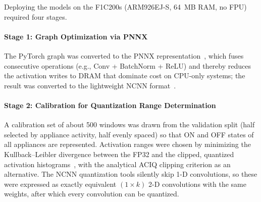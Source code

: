 \documentclass[fleqn,10pt]{wlscirep}
\begin{document}
Deploying the models on the F1C200s (ARM926EJ-S, 64~MB RAM, no FPU) required four stages.

\paragraph{Stage 1: Graph Optimization via PNNX}
The PyTorch graph was converted to the PNNX representation~\cite{pnnx}, which fuses consecutive operations (e.g., Conv + BatchNorm + ReLU) and thereby reduces the activation writes to DRAM that dominate cost on CPU-only systems; the result was converted to the lightweight NCNN format~\cite{ncnn2024}.

\paragraph{Stage 2: Calibration for Quantization Range Determination}
A calibration set of about 500 windows was drawn from the validation split (half selected by appliance activity, half evenly spaced) so that ON and OFF states of all appliances are represented. Activation ranges were chosen by minimizing the Kullback--Leibler divergence between the FP32 and the clipped, quantized activation histograms~\cite{migacz2017tensorrt}, with the analytical ACIQ clipping criterion as an alternative. The NCNN quantization tools silently skip 1-D convolutions, so these were expressed as exactly equivalent $(1\times k)$ 2-D convolutions with the same weights, after which every convolution can be quantized.
\end{document}
